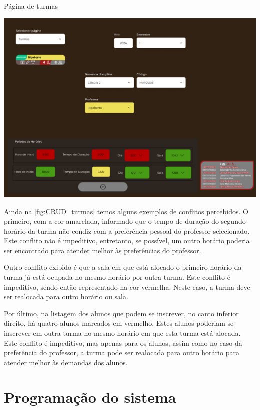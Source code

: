 \begin{MyCenteredFigure} \caption{Página de turmas} \label{fig:CRUD_turmas}
  \includegraphics[width=\textwidth]{files/img/2.02!5-desenvolvimento/2.02!5.1.3-prototipagem/2.02!5.1.3.2-paginas/CRUD_turmas}
\end{MyCenteredFigure}

Ainda na \autoref{fig:CRUD_turmas} temos alguns exemplos de conflitos percebidos. O primeiro, com a cor amarelada, informado que o tempo de duração do segundo horário da turma não condiz com a preferência pessoal do professor selecionado. Este conflito não é impeditivo, entretanto, se possível, um outro horário poderia ser encontrado para atender melhor às preferências do professor.

Outro conflito exibido é que a sala em que está alocado o primeiro horário da turma já está ocupada no mesmo horário por outra turma. Este conflito é impeditivo, sendo então representado na cor vermelha. Neste caso, a turma deve ser realocada para outro horário ou sala.

Por último, na listagem dos alunos que podem se inscrever, no canto inferior direito, há quatro alunos marcados em vermelho. Estes alunos poderiam se inscrever em outra turma no mesmo horário em que esta turma está alocada. Este conflito é impeditivo, mas apenas para os alunos, assim como no caso da preferência do professor, a turma pode ser realocada para outro horário para atender melhor às demandas dos alunos.

\section{Programação do sistema} \label{sec:programação} %

